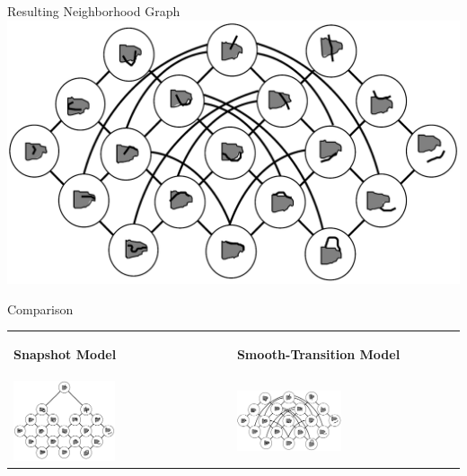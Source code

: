 	\begin{frame}{Resulting Neighborhood Graph}
		\includegraphics[width=\textwidth]{images/smooth_transitions_neighborhood_graph.png}
	\end{frame}

	
	\begin{frame}{Comparison}
		\begin{tabularx}{\textwidth}{XX}
			\begin{center}
				\textbf{Snapshot Model}
			\end{center}
			&
			\begin{center}
			\textbf{Smooth-Transition Model}
			\end{center} \\
			\includegraphics[width=0.48\textwidth]{images/snapshot_model_neighborhood_graph_simple.png}
			&
			\includegraphics[width=0.48\textwidth]{images/smooth_transitions_neighborhood_graph.png}
		\end{tabularx}
	\end{frame}

